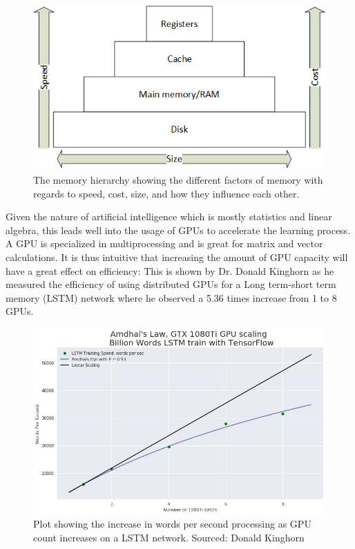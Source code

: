 \documentclass[../main.tex]{subfiles}
\begin{document}
\begin{figure}
    \centering
    \includegraphics[scale=.7]{img/memory_hierarchy.png}
    \caption{The memory hierarchy showing the different factors of memory with regards to speed, cost, size, and how they influence each other.}
    \label{fig:memory_hierarchy}
\end{figure}
Given the nature of artificial intelligence which is mostly statistics and linear algebra, this leads well into the usage of GPUs to accelerate the learning process. A GPU is specialized in multiprocessing and is great for matrix and vector calculations. It is thus intuitive that increasing the amount of GPU capacity will have a great effect on efficiency: This is shown by Dr. Donald Kinghorn as he measured the efficiency of using distributed GPUs for a Long term-short term memory (LSTM) network where he observed a 5.36 times increase from 1 to 8 GPUs. \cite{puget_tensorflow}
\begin{figure}[H]
    \centering
    \includegraphics[scale=.5]{img/puget_tensor.jpg}
    \caption{Plot showing the increase in words per second processing as GPU count increases on a LSTM network. Sourced: Donald Kinghorn \cite{puget_tensorflow}}
    \label{fig:puget_tensorflow}
\end{figure}
\end{document}
